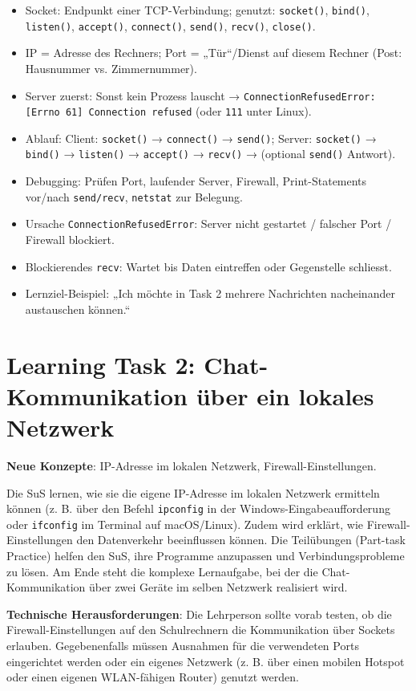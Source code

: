 \begin{myexercise}
\begin{myanswer}
\begin{itemize}
    \item Socket: Endpunkt einer TCP-Verbindung; genutzt: \texttt{socket()}, \texttt{bind()}, \texttt{listen()}, \texttt{accept()}, \texttt{connect()}, \texttt{send()}, \texttt{recv()}, \texttt{close()}.
    \item IP = Adresse des Rechners; Port = „Tür“/Dienst auf diesem Rechner (Post: Hausnummer vs. Zimmernummer).
    \item Server zuerst: Sonst kein Prozess lauscht → \texttt{ConnectionRefusedError: [Errno 61] Connection refused} (oder \texttt{111} unter Linux).
    \item Ablauf: Client: \texttt{socket()} → \texttt{connect()} → \texttt{send()}; Server: \texttt{socket()} → \texttt{bind()} → \texttt{listen()} → \texttt{accept()} → \texttt{recv()} → (optional \texttt{send()} Antwort).
    \item Debugging: Prüfen Port, laufender Server, Firewall, Print-Statements vor/nach \texttt{send/recv}, \texttt{netstat} zur Belegung.
    \item Ursache \texttt{ConnectionRefusedError}: Server nicht gestartet / falscher Port / Firewall blockiert.
    \item Blockierendes \texttt{recv}: Wartet bis Daten eintreffen oder Gegenstelle schliesst.
    \item Lernziel-Beispiel: „Ich möchte in Task 2 mehrere Nachrichten nacheinander austauschen können.“
\end{itemize}
\end{myanswer}
\end{myexercise}

\section{Learning Task 2: Chat-Kommunikation über ein lokales Netzwerk}

\begin{scaffoldBox}
    \textbf{Neue Konzepte}: IP-Adresse im lokalen Netzwerk, Firewall-Einstellungen.

    Die SuS lernen, wie sie die eigene IP-Adresse im lokalen Netzwerk ermitteln können (z. B. über den Befehl \texttt{ipconfig} in der Windows-Eingabeaufforderung oder \texttt{ifconfig} im Terminal auf macOS/Linux). Zudem wird erklärt, wie Firewall-Einstellungen den Datenverkehr beeinflussen können. Die Teilübungen (Part-task Practice) helfen den SuS, ihre Programme anzupassen und Verbindungsprobleme zu lösen. Am Ende steht die komplexe Lernaufgabe, bei der die Chat-Kommunikation über zwei Geräte im selben Netzwerk realisiert wird.

    \textbf{Technische Herausforderungen}: Die Lehrperson sollte vorab testen, ob die Firewall-Einstellungen auf den Schulrechnern die Kommunikation über Sockets erlauben. Gegebenenfalls müssen Ausnahmen für die verwendeten Ports eingerichtet werden oder ein eigenes Netzwerk (z. B. über einen mobilen Hotspot oder einen eigenen WLAN-fähigen Router) genutzt werden.
\end{scaffoldBox}

